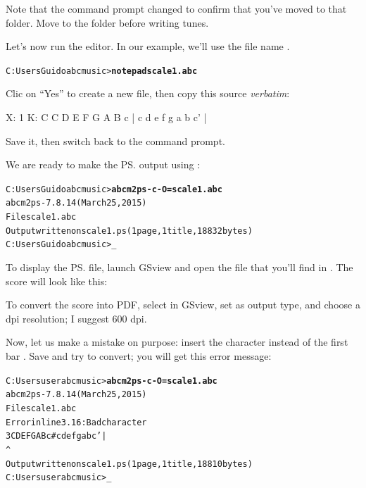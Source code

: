 \documentclass[a4paper,12pt]{book}
\begin{document}
Note that the command prompt changed to confirm that you've moved to
that folder. Move to the  folder before writing tunes.

Let's now run the  editor. In our example, we'll use the
file name .

\begin{alltt}
C:\bl{}Users\bl{}Guido\bl{}abcmusic>\textbf{notepad scale1.abc}
\end{alltt}

Clic on ``Yes'' to create a new file, then copy this source 
\emph{verbatim}:

\begin{abcsource}
X: 1 %
K: C %
C D E F G A B c | c d e f g a b c' |
\end{abcsource}

Save it, then switch back to the command prompt.

We are ready to make the \ps{} output using \abcm:

\begin{alltt}
C:\bl{}Users\bl{}Guido\bl{}abcmusic>\textbf{abcm2ps -c -O= scale1.abc}
abcm2ps-7.8.14 (March 25, 2015)
File scale1.abc
Output written on scale1.ps (1 page, 1 title, 18832 bytes)
C:\bl{}Users\bl{}Guido\bl{}abcmusic>_
\end{alltt}

To display the \ps{} file, launch GSview and open the 
file that you'll find in . The score will look like this:

\medskip


\medskip

To convert the score into PDF, select  in
GSview, set  as output type, and choose a dpi
resolution; I suggest 600 dpi.

Now, let us make a mistake on purpose: insert the \car{\#} character
instead of the first bar \car{\textbar}. Save and try to convert; you
will get this error message:

\begin{alltt}
C:\bl{}Users\bl{}user\bl{}abcmusic>\textbf{abcm2ps -c -O= scale1.abc}
abcm2ps-7.8.14 (March 25, 2015)
File scale1.abc
Error in line 3.16: Bad character
   3 C D E F G A B c # c d e f g a b c' |
                     ^
Output written on scale1.ps (1 page, 1 title, 18810 bytes)
C:\bl{}Users\bl{}user\bl{}abcmusic>_
\end{alltt}
\end{document}
